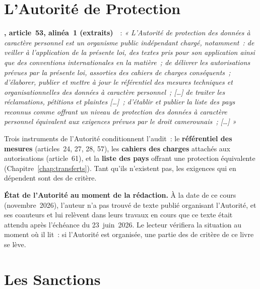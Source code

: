 \section{L'Autorité de Protection}
\label{sec:c08-autorite}

\begin{boxjuris}
\textbf{, article~53, alinéa~1 (extraits)}~\cite{loi2024017}~:
\textit{« L'Autorité de protection des données à caractère personnel est un
organisme public indépendant chargé, notamment~: de veiller à l'application
de la présente loi, des textes pris pour son application ainsi que des
conventions internationales en la matière~; de délivrer les autorisations
prévues par la présente loi, assorties des cahiers de charges
conséquents~; d'élaborer, publier et mettre à jour le référentiel des
mesures techniques et organisationnelles des données à caractère
personnel~; [\ldots] de traiter les réclamations, pétitions et plaintes
[\ldots]~; d'établir et publier la liste des pays reconnus comme offrant un
niveau de protection des données à caractère personnel équivalent aux
exigences prévues par le droit camerounais~; [\ldots] »}
\end{boxjuris}

Trois instruments de l'Autorité conditionnent l'audit~: le
\textbf{référentiel des mesures} (articles~24, 27, 28, 57), les
\textbf{cahiers des charges} attachés aux autorisations (article~61), et la
\textbf{liste des pays} offrant une protection équivalente
(Chapitre~\ref{chap:transferts}). Tant qu'ils n'existent pas, les exigences
qui en dépendent sont des \NEK{} de critère.

\begin{boxinfo}
\textbf{État de l'Autorité au moment de la rédaction.} À la date de ce cours
(novembre~2026), l'auteur n'a pas trouvé de texte publié organisant
l'Autorité, et ses coauteurs et lui relèvent dans leurs travaux en cours que
ce texte était attendu après l'échéance du 23~juin~2026. Le lecteur
vérifiera la situation au moment où il lit~: si l'Autorité est organisée,
une partie des \NEK{} de critère de ce livre se lève.
\end{boxinfo}

\section{Les Sanctions}
\label{sec:c08-sanctions}

